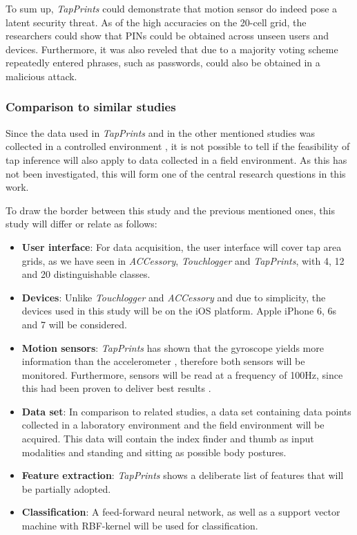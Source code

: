 To sum up, \textit{TapPrints} could demonstrate that motion sensor do indeed pose a latent security threat. As of the high accuracies on the 20-cell grid, the researchers could show that PINs could be obtained across unseen users and devices. Furthermore, it was also reveled that due to a majority voting scheme repeatedly entered phrases, such as passwords, could also be obtained in a malicious attack.

\subsubsection{Comparison to similar studies}

Since the data used in \textit{TapPrints} and in the other mentioned studies was collected in a controlled environment \cite{Accessory,Touchlogger,Tapprints}, it is not possible to tell if the feasibility of tap inference will also apply to data collected in a field environment. As this has not been investigated, this will form one of the central research questions in this work.

To draw the border between this study and the previous mentioned ones, this study will differ or relate as follows:
\begin{itemize}
  \item \textbf{User interface}: For data acquisition, the user interface will cover tap area grids, as we have seen in \textit{ACCessory}, \textit{Touchlogger} and \textit{TapPrints}, with 4, 12 and 20 distinguishable classes.
  \item \textbf{Devices}: Unlike \textit{Touchlogger} and \textit{ACCessory} and due to simplicity, the devices used in this study will be on the iOS platform. Apple iPhone 6, 6s and 7 will be considered.
  \item \textbf{Motion sensors}: \textit{TapPrints} has shown that the gyroscope yields more information than the accelerometer \cite{Tapprints}, therefore both sensors will be monitored. Furthermore, sensors will be read at a frequency of 100Hz, since this had been proven to deliver best results \cite{Tapprints, Accessory}.
  \item \textbf{Data set}: In comparison to related studies, a data set containing data points collected in a laboratory environment and the field environment will be acquired. This data will contain the index finder and thumb as input modalities and standing and sitting as possible body postures.
  \item \textbf{Feature extraction}: \textit{TapPrints} shows a deliberate list of features \cite{Tapprints} that will be partially adopted.
  \item \textbf{Classification}: A feed-forward neural network, as well as a support vector machine with RBF-kernel will be used for classification.
\end{itemize}

